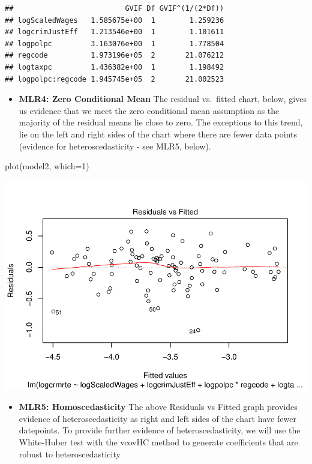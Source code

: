 \documentclass[]{article}
\newenvironment{Shaded}{}{}
\newcommand{\DataTypeTok}[1]{#1}
\newcommand{\DecValTok}[1]{#1}
\newcommand{\KeywordTok}[1]{\textcolor[rgb]{0.00,0.00,1.00}{#1}}
\newcommand{\NormalTok}[1]{#1}
\providecommand{\tightlist}{%
  \setlength{\itemsep}{0pt}\setlength{\parskip}{0pt}}
\begin{document}
\begin{verbatim}
##                          GVIF Df GVIF^(1/(2*Df))
## logScaledWages   1.585675e+00  1        1.259236
## logcrimJustEff   1.213546e+00  1        1.101611
## logpolpc         3.163076e+00  1        1.778504
## regcode          1.973196e+05  2       21.076212
## logtaxpc         1.436382e+00  1        1.198492
## logpolpc:regcode 1.945745e+05  2       21.002523
\end{verbatim}

\begin{itemize}
\tightlist
\item
  \textbf{MLR4: Zero Conditional Mean} The residual vs.~fitted chart,
  below, gives us evidence that we meet the zero conditional mean
  assumption as the majority of the residual means lie close to zero.
  The exceptions to this trend, lie on the left and right sides of the
  chart where there are fewer data points (evidence for
  heteroscedasticity - see MLR5, below).
\end{itemize}

\begin{Shaded}
\begin{Highlighting}[]
\KeywordTok{plot}\NormalTok{(model2, }\DataTypeTok{which=}\DecValTok{1}\NormalTok{)}
\end{Highlighting}
\end{Shaded}

\includegraphics{Bagnard_Gaustad_Hartman_Leung_Lab_3_files/figure-latex/unnamed-chunk-73-1.pdf}

\begin{itemize}
\tightlist
\item
  \textbf{MLR5: Homoscedasticity} The above Residuals vs Fitted graph
  provides evidence of heteroscedasticity as right and left sides of the
  chart have fewer datepoints. To provide further evidence of
  heteroscedasticity, we will use the White-Huber test with the vcovHC
  method to generate coefficients that are robust to heteroscedasticity
\end{itemize}
\end{document}
